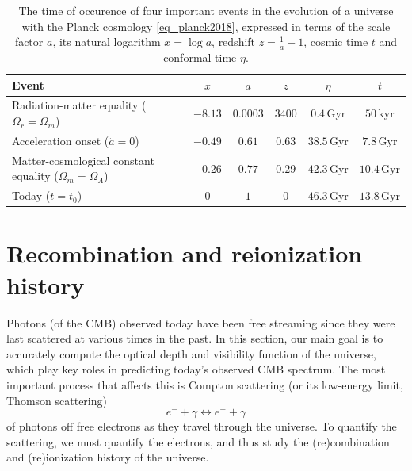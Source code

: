 \documentclass[10pt,a4paper]{article}
\begin{document}
\begin{table}
\centering
\caption{%
	The time of occurence of four important events in the evolution of a universe with the Planck cosmology \eqref{eq_planck2018},
	expressed in terms of the scale factor $a$, its natural logarithm $x = \log a$, redshift $z = \frac1a - 1$, cosmic time $t$ and conformal time $\eta$.
}
\label{table_times1}
\begin{tabular}{l c c c c c}
	\toprule
	Event                                                               & $x$     & $a$       & $z$    & $\eta$    & $t$ \\
	\midrule
	Radiation-matter equality ($\Omega_r = \Omega_m$)                   & $-8.13$ & $0.0003$  & $3400$ & $0.4\,\mathrm{Gyr}$ & $50\,\mathrm{kyr}$ \\
	Acceleration onset ($\ddot{a} = 0$)                                 & $-0.49$ & $0.61$    & $0.63$ & $38.5\,\mathrm{Gyr}$ & $7.8\,\mathrm{Gyr}$   \\
	Matter-cosmological constant equality ($\Omega_m = \Omega_\Lambda$) & $-0.26$ & $0.77$    & $0.29$ & $42.3\,\mathrm{Gyr}$ & $10.4\,\mathrm{Gyr}$  \\
	Today ($t = t_0$)                                                   & $0$     & $1$       & $0$    & $46.3\,\mathrm{Gyr}$ & $13.8\,\mathrm{Gyr}$  \\
	\bottomrule
\end{tabular}
\end{table}

\clearpage
\section{Recombination and reionization history}
\label{sec_recombination}

Photons (of the CMB) observed today have been free streaming since they were last scattered at various times in the past.
In this section, our main goal is to accurately compute the optical depth and visibility function of the universe,
which play key roles in predicting today's observed CMB spectrum.
The most important process that affects this is Compton scattering (or its low-energy limit, Thomson scattering)
\begin{equation}
	e^- + \gamma \leftrightarrow e^- + \gamma
\label{eq_thomson_scattering}
\end{equation}
of photons off free electrons as they travel through the universe.
To quantify the scattering, we must quantify the electrons,
and thus study the (re)combination and (re)ionization history of the universe.
\end{document}
